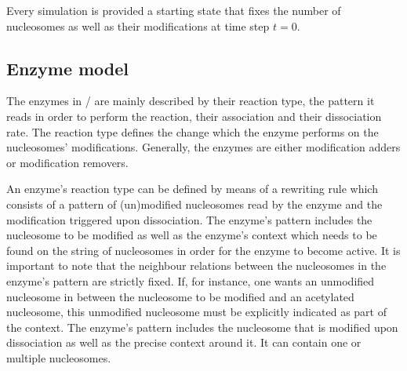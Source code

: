             Every simulation is provided a starting state that fixes the number of nucleosomes as well as their modifications at time step $t=0$.

        \subsection{Enzyme model}

            The enzymes in \ed/ are mainly described by their reaction type, the pattern it reads in order to perform the reaction, their association and their dissociation rate. The reaction type defines the change which the enzyme performs on the nucleosomes' modifications. Generally, the enzymes are either modification adders or modification removers.


            An enzyme's reaction type can be defined by means of a rewriting rule which consists of a pattern of (un)modified nucleosomes read by the enzyme and the modification triggered upon dissociation. The enzyme's pattern includes the nucleosome to be modified as well as the enzyme's context which needs to be found on the string of nucleosomes in order for the enzyme to become active. It is important to note that the neighbour relations between the nucleosomes in the enzyme's pattern are strictly fixed. If, for instance, one wants an unmodified nucleosome  in between the nucleosome to be modified and an acetylated nucleosome, this unmodified nucleosome must be explicitly indicated as part of the context. The enzyme's pattern includes the nucleosome that is modified upon dissociation as well as the precise context around it. It can contain one or multiple nucleosomes.

